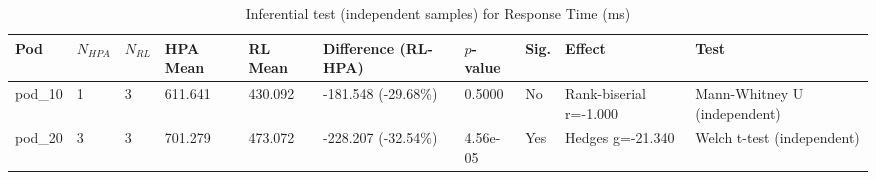 \begin{table}[ht]
  \centering
  \caption{Inferential test (independent samples) for Response Time (ms)}\label{tab:inferensial-response_time}
  \begin{tabular}{llllllllll}
    \toprule
    Pod & $N_{HPA}$ & $N_{RL}$ & HPA Mean & RL Mean & Difference (RL-HPA) & $p$-value & Sig. & Effect & Test \\
    \midrule
    pod\_10 & 1 & 3 & 611.641 & 430.092 & -181.548 (-29.68\%) & 0.5000 & No & Rank-biserial r=-1.000 & Mann-Whitney U (independent) \\
    pod\_20 & 3 & 3 & 701.279 & 473.072 & -228.207 (-32.54\%) & 4.56e-05 & Yes & Hedges g=-21.340 & Welch t-test (independent) \\
    \bottomrule
  \end{tabular}
\end{table}